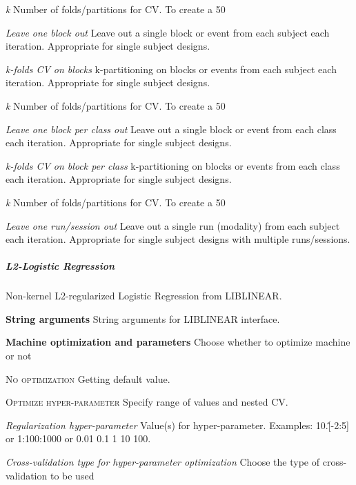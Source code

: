 \textit{k}
Number of folds/partitions for CV. To create a 50%


\textit{Leave one block out}
Leave out a single block or event from each subject each iteration. Appropriate for single subject designs.


\textit{k-folds CV on blocks}
k-partitioning on blocks or events from each subject each iteration. Appropriate for single subject designs.


\textit{k}
Number of folds/partitions for CV. To create a 50%


\textit{Leave one block per class out}
Leave out a single block or event from each class each iteration. Appropriate for single subject designs.


\textit{k-folds CV on block per class}
k-partitioning on blocks or events from each class each iteration. Appropriate for single subject designs.


\textit{k}
Number of folds/partitions for CV. To create a 50%


\textit{Leave one run/session out}
Leave out a single run (modality) from each subject each iteration. Appropriate for single subject designs with multiple runs/sessions.


\subparagraph{L2-Logistic Regression}
Non-kernel L2-regularized Logistic Regression from LIBLINEAR.


\textbf{String arguments}
String arguments for LIBLINEAR interface.


\textbf{Machine optimization and parameters}
Choose whether to optimize machine or not


\textsc{No optimization}
Getting default value.


\textsc{Optimize hyper-parameter}
Specify range of values and nested CV.


\textsl{Regularization hyper-parameter}
Value(s) for hyper-parameter. Examples: 10.\^[-2:5] or 1:100:1000 or 0.01 0.1 1 10 100.


\textsl{Cross-validation type for hyper-parameter optimization}
Choose the type of cross-validation to be used


